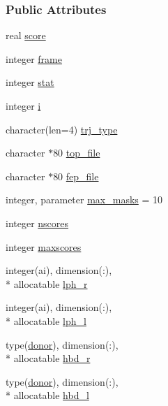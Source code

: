 \subsubsection*{Public Attributes}
\begin{DoxyCompactItemize}
\item 
real \hyperlink{classcalc__chemscore_a0a128ccdf119ded09ab8d3ef43bae64c}{score}
\item 
integer \hyperlink{classcalc__chemscore_a4cd182377bd9390c602bd0a0c169a345}{frame}
\item 
integer \hyperlink{classcalc__chemscore_a3b2724ed780bdae65bbbec15ac8422c8}{stat}
\item 
integer \hyperlink{classcalc__chemscore_a5579c59a11b61014e8a2d04bd984678e}{i}
\item 
character(len=4) \hyperlink{classcalc__chemscore_a47f6a15d75ed5c28132a8cc8c8141416}{trj\-\_\-type}
\item 
character $\ast$80 \hyperlink{classcalc__chemscore_a6c1dfab249f0271c1032ed943ecb6d86}{top\-\_\-file}
\item 
character $\ast$80 \hyperlink{classcalc__chemscore_a8a0c88973d83ec082072a7115b8c0e45}{fep\-\_\-file}
\item 
integer, parameter \hyperlink{classcalc__chemscore_a035d2a19bada1d6c65c8ac2d7574c263}{max\-\_\-masks} = 10
\item 
integer \hyperlink{classcalc__chemscore_a410140d396d152254ee380ca143a2171}{nscores}
\item 
integer \hyperlink{classcalc__chemscore_a17d6933892fcc2b0199a9946b8d761a3}{maxscores}
\item 
integer(ai), dimension(\-:), \\*
allocatable \hyperlink{classcalc__chemscore_ab1e216a48152826de41fffb5a9d2d48e}{lph\-\_\-r}
\item 
integer(ai), dimension(\-:), \\*
allocatable \hyperlink{classcalc__chemscore_a39c1639390221a6c4a2a8edba8cb98cc}{lph\-\_\-l}
\item 
type(\hyperlink{structcalc__chemscore_1_1donor}{donor}), dimension(\-:), \\*
allocatable \hyperlink{classcalc__chemscore_aa414095b9d9b645a440912b5a2022214}{hbd\-\_\-r}
\item 
type(\hyperlink{structcalc__chemscore_1_1donor}{donor}), dimension(\-:), \\*
allocatable \hyperlink{classcalc__chemscore_a38023298e024f0fc25e3f31f390cffb8}{hbd\-\_\-l}
\item 

\end{DoxyCompactItemize}
